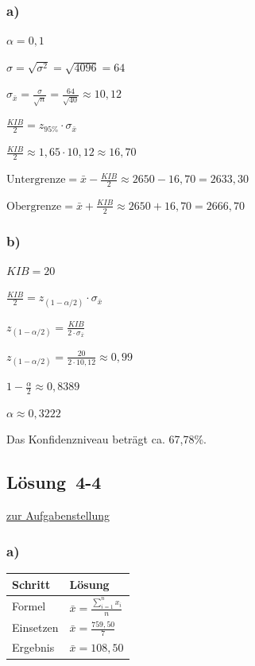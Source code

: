 \documentclass[
  11pt,
  ngerman,
  a4paper,
]{report}
\begin{document}
\hypertarget{a-14}{%
\subsubsection{a)}\label{a-14}}

\(\alpha=0{,}1\)

\(\sigma=\sqrt{\sigma^2}=\sqrt{4096}=64\)

\(\sigma_{\bar{x}}=\frac{\sigma}{\sqrt{n}}=\frac{64}{\sqrt{40}}\approx10{,}12\)

\(\frac{\mathit{KIB}}{2}=z_{95\%} \cdot \sigma_{\bar{x}}\)

\(\frac{\mathit{KIB}}{2}\approx 1{,}65 \cdot 10{,}12\approx16{,}70\)

\(\textrm{Untergrenze} = \bar{x} - \frac{\mathit{KIB}}{2} \approx 2650 - 16{,}70 = 2633{,}30\)

\(\textrm{Obergrenze} = \bar{x} + \frac{\mathit{KIB}}{2} \approx 2650 + 16{,}70 = 2666{,}70\)

\hypertarget{b-14}{%
\subsubsection{b)}\label{b-14}}

\(\mathit{KIB}=20\)

\(\frac{\mathit{KIB}}{2}=z_{(1-\alpha/2)} \cdot \sigma_{\bar{x}}\)

\(z_{(1-\alpha/2)}=\frac{\mathit{KIB}}{2\cdot \sigma_{\bar{x}}}\)

\(z_{(1-\alpha/2)}=\frac{20}{2 \cdot 10{,}12}\approx0{,}99\)

\(1-\frac{\alpha}{2}\approx0{,}8389\)

\(\alpha\approx 0{,}3222\)

Das Konfidenzniveau beträgt ca. 67,78\%.

\hypertarget{loesung-4-4}{%
\subsection{Lösung~4-4}\label{loesung-4-4}}

\protect\hyperlink{aufgabe-4-4}{zur Aufgabenstellung}

\hypertarget{a-15}{%
\subsubsection{a)}\label{a-15}}

\begin{table}[H]
\centering
\begin{tabular}{ll}
\toprule
\textbf{Schritt} & \textbf{Lösung}\\
\midrule
Formel & $\bar{x}=\frac{\sum\limits_{i=1}^{n}x_{i}}{n}$\\
Einsetzen & $\bar{x}=\frac{759{,}50}{7}$\\
Ergebnis & $\bar{x}=108{,}50$\\
\bottomrule
\end{tabular}
\end{table}
\end{document}
